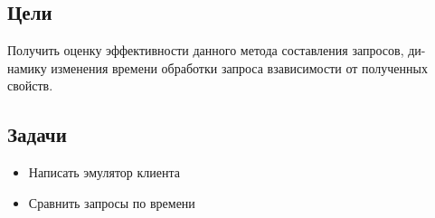 \subsection{Цели}
Получить оценку эффективности данного метода составления запросов, ди-
намику изменения времени обработки запроса взависимости от полученных
свойств.
\subsection{Задачи}
\begin{itemize}
\item Написать эмулятор клиента
\item Сравнить запросы по времени
\end{itemize}

